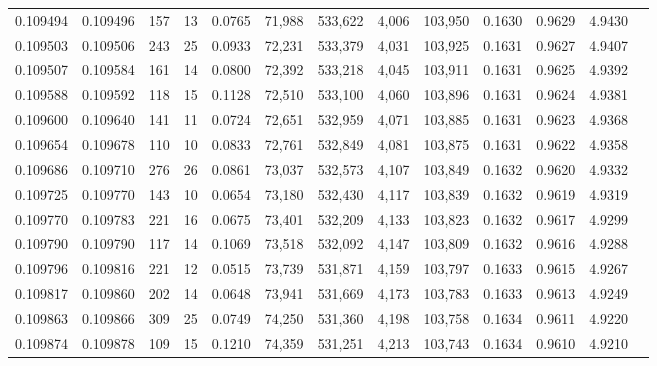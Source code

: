 \begin{tabular}{rrrrrrrrrrrrr}
0.109494 & 0.109496 &   157 &  13 &                                     0.0765 &  71,988 & 533,622 &   4,006 & 103,950 & 0.1630 & 0.9629 & 4.9430 \\
0.109503 & 0.109506 &   243 &  25 &                                     0.0933 &  72,231 & 533,379 &   4,031 & 103,925 & 0.1631 & 0.9627 & 4.9407 \\
0.109507 & 0.109584 &   161 &  14 &                                     0.0800 &  72,392 & 533,218 &   4,045 & 103,911 & 0.1631 & 0.9625 & 4.9392 \\
0.109588 & 0.109592 &   118 &  15 &                                     0.1128 &  72,510 & 533,100 &   4,060 & 103,896 & 0.1631 & 0.9624 & 4.9381 \\
0.109600 & 0.109640 &   141 &  11 &                                     0.0724 &  72,651 & 532,959 &   4,071 & 103,885 & 0.1631 & 0.9623 & 4.9368 \\
0.109654 & 0.109678 &   110 &  10 &                                     0.0833 &  72,761 & 532,849 &   4,081 & 103,875 & 0.1631 & 0.9622 & 4.9358 \\
0.109686 & 0.109710 &   276 &  26 &                                     0.0861 &  73,037 & 532,573 &   4,107 & 103,849 & 0.1632 & 0.9620 & 4.9332 \\
0.109725 & 0.109770 &   143 &  10 &                                     0.0654 &  73,180 & 532,430 &   4,117 & 103,839 & 0.1632 & 0.9619 & 4.9319 \\
0.109770 & 0.109783 &   221 &  16 &                                     0.0675 &  73,401 & 532,209 &   4,133 & 103,823 & 0.1632 & 0.9617 & 4.9299 \\
0.109790 & 0.109790 &   117 &  14 &                                     0.1069 &  73,518 & 532,092 &   4,147 & 103,809 & 0.1632 & 0.9616 & 4.9288 \\
0.109796 & 0.109816 &   221 &  12 &                                     0.0515 &  73,739 & 531,871 &   4,159 & 103,797 & 0.1633 & 0.9615 & 4.9267 \\
0.109817 & 0.109860 &   202 &  14 &                                     0.0648 &  73,941 & 531,669 &   4,173 & 103,783 & 0.1633 & 0.9613 & 4.9249 \\
0.109863 & 0.109866 &   309 &  25 &                                     0.0749 &  74,250 & 531,360 &   4,198 & 103,758 & 0.1634 & 0.9611 & 4.9220 \\
0.109874 & 0.109878 &   109 &  15 &                                     0.1210 &  74,359 & 531,251 &   4,213 & 103,743 & 0.1634 & 0.9610 & 4.9210 \\

\end{tabular}
